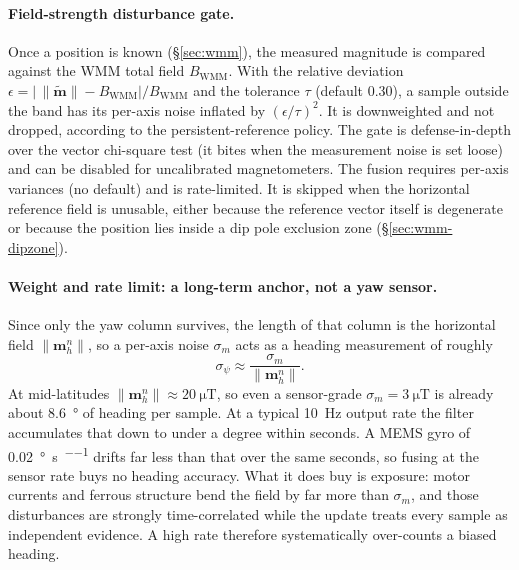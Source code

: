 \documentclass[11pt,a4paper]{article}
\newcommand{\vect}[1]{\bm{#1}}
\newcommand{\nframe}{n}
\begin{document}
\paragraph{Field-strength disturbance gate.} Once a position is known
(\S\ref{sec:wmm}), the measured magnitude is compared against the WMM
total field $B_{\text{WMM}}$. With the relative deviation
$\epsilon = \big|\,\|\tilde{\vect{m}}\| - B_{\text{WMM}}\big| /
B_{\text{WMM}}$ and the tolerance $\tau$ (default 0.30), a sample outside
the band has its per-axis noise inflated by $(\epsilon/\tau)^2$. It is
downweighted and not dropped, according to the persistent-reference policy. The
gate is defense-in-depth over the vector chi-square test (it bites when
the measurement noise is set loose) and can be disabled for
uncalibrated magnetometers. The fusion requires per-axis variances
(no default) and is rate-limited. It is skipped when the horizontal
reference field is unusable, either because the reference vector itself
is degenerate or because the position lies inside a dip pole exclusion
zone (\S\ref{sec:wmm-dipzone}).

\paragraph{Weight and rate limit: a long-term anchor, not a yaw sensor.}
Since only the yaw column survives, the length of that column is the
horizontal field $\|\vect{m}^\nframe_h\|$, so a per-axis noise
$\sigma_m$ acts as a heading measurement of roughly
\begin{equation}
  \sigma_\psi \approx \frac{\sigma_m}{\|\vect{m}^\nframe_h\|} .
\end{equation}
At mid-latitudes $\|\vect{m}^\nframe_h\| \approx
\SI{20}{\micro\tesla}$, so even a sensor-grade
$\sigma_m = \SI{3}{\micro\tesla}$ is already about
\SI{8.6}{\degree} of heading per sample. At a typical
\SI{10}{\hertz} output rate the filter accumulates that down to under a
degree within seconds. A MEMS gyro of
\SI{0.02}{\degree\per\second\per\sqrt{\hertz}} drifts far less than that
over the same seconds, so fusing at the sensor rate buys no heading
accuracy. What it does buy is exposure: motor currents and ferrous
structure bend the field by far more than $\sigma_m$, and those
disturbances are strongly time-correlated while the update treats every
sample as independent evidence. A high rate therefore systematically
over-counts a biased heading.
\end{document}
